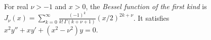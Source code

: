 
For real $\nu>-1$ and $x>0$, the \emph{Bessel function of the first kind} is $J_\nu(x)=\sum_{k=0}^\infty\frac{(-1)^k}{k!\,\Gamma(k+\nu+1)}(x/2)^{2k+\nu}$. It satisfies $x^2y''+xy'+(x^2-\nu^2)y=0$.
